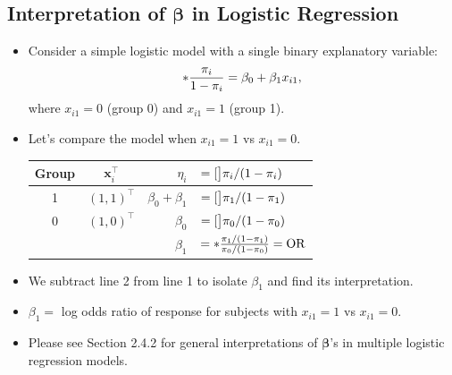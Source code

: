 \documentclass{article}\usepackage[]{graphicx}\usepackage[svgnames]{xcolor}
\let\log\relax%
\newcommand{\OR}{\text{OR}}%
\providecommand{\Vector}[1]{\bm{#1}}%
\begin{document}
\subsection*{Interpretation of $ \Vector{\beta} $ in Logistic Regression}
\begin{itemize}
      \item Consider a simple logistic model with a single binary explanatory variable:
            \[ \log*{\frac{\pi_i}{1-\pi_i}}=\beta_0+\beta_1x_{i1}, \]
            where $ x_{i1}=0 $ (group 0) and $ x_{i1}=1 $ (group 1).
      \item Let's compare the model when $ x_{i1}=1 $ vs $ x_{i1}=0 $.
            \begin{table}[!htbp]
                  \centering
                  \begin{tabular}{ccrl}
                        Group & $ \Vector{x}_i^\top $ & $ \eta_i $          & $ =\log[\big]{\pi_i/(1-\pi_i)} $                              \\
                        \midrule
                        1     & $ (1,1)^\top $        & $ \beta_0+\beta_1 $ & $ =\log[\big]{\pi_1/(1-\pi_1)} $                              \\
                        0     & $ (1,0)^\top $        & $ \beta_0 $         & $ =\log[\big]{\pi_0/(1-\pi_0)} $                              \\
                        \midrule
                              &                       & $ \beta_1 $         & $ =\log*{\frac{\pi_1/(1-\pi_1)}{\pi_0/(1-\pi_0)}}=\log{\OR} $
                  \end{tabular}
            \end{table}
      \item We subtract line 2 from line 1 to isolate $ \beta_1 $ and find its interpretation.
      \item $ \beta_1= $ log odds ratio of response for subjects with $ x_{i1}=1 $ vs $ x_{i1}=0 $.
      \item Please see Section 2.4.2 for general interpretations of $ \Vector{\beta} $'s in multiple logistic regression models.
\end{itemize}
\end{document}
